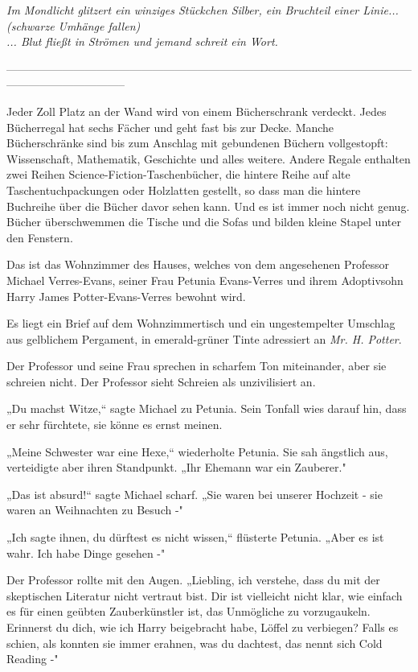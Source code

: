 {\hfill\break

\emph{Im Mondlicht glitzert ein winziges Stückchen Silber, ein Bruchteil einer Linie...}\\ \emph{(schwarze Umhänge fallen)}\\ \emph{... Blut fließt in Strömen und jemand schreit ein Wort.}

\hfill\break

--------------------------------------------------------------------------------------------------------------------------------------------

\hfill\break Jeder Zoll Platz an der Wand wird von einem Bücherschrank verdeckt. Jedes Bücherregal hat sechs Fächer und geht fast bis zur Decke. Manche Bücherschränke sind bis zum Anschlag mit gebundenen Büchern vollgestopft: Wissenschaft, Mathematik, Geschichte und alles weitere. Andere Regale enthalten zwei Reihen Science-Fiction-Taschenbücher, die hintere Reihe auf alte Taschentuchpackungen oder Holzlatten gestellt, so dass man die hintere Buchreihe über die Bücher davor sehen kann. Und es ist immer noch nicht genug. Bücher überschwemmen die Tische und die Sofas und bilden kleine Stapel unter den Fenstern.

Das ist das Wohnzimmer des Hauses, welches von dem angesehenen Professor Michael Verres-Evans, seiner Frau Petunia Evans-Verres und ihrem Adoptivsohn Harry James Potter-Evans-Verres bewohnt wird.

Es liegt ein Brief auf dem Wohnzimmertisch und ein ungestempelter Umschlag aus gelblichem Pergament, in emerald-grüner Tinte adressiert an \emph{Mr. H. Potter}.

Der Professor und seine Frau sprechen in scharfem Ton miteinander, aber sie schreien nicht. Der Professor sieht Schreien als unzivilisiert an.

„Du machst Witze,“ sagte Michael zu Petunia. Sein Tonfall wies darauf hin, dass er sehr fürchtete, sie könne es ernst meinen.

„Meine Schwester war eine Hexe,“ wiederholte Petunia. Sie sah ängstlich aus, verteidigte aber ihren Standpunkt. „Ihr Ehemann war ein Zauberer."

„Das ist absurd!“ sagte Michael scharf. „Sie waren bei unserer Hochzeit - sie waren an Weihnachten zu Besuch -"

„Ich sagte ihnen, du dürftest es nicht wissen,“ flüsterte Petunia. „Aber es ist wahr. Ich habe Dinge gesehen -"

Der Professor rollte mit den Augen. „Liebling, ich verstehe, dass du mit der skeptischen Literatur nicht vertraut bist. Dir ist vielleicht nicht klar, wie einfach es für einen geübten Zauberkünstler ist, das Unmögliche zu vorzugaukeln. Erinnerst du dich, wie ich Harry beigebracht habe, Löffel zu verbiegen? Falls es schien, als konnten sie immer erahnen, was du dachtest, das nennt sich Cold Reading -"

}
